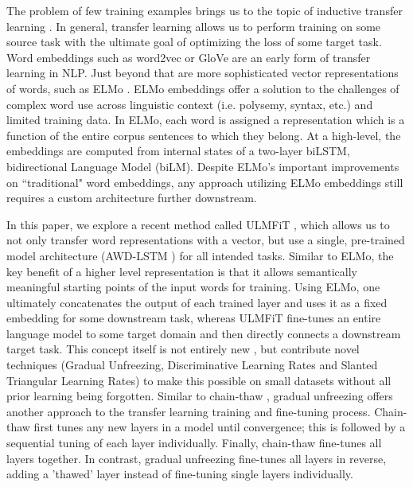 \documentclass[11pt,a4paper]{article}
\begin{document}
The problem of few training examples brings us to the topic of inductive transfer learning \cite{pan2010survey}. In general, transfer learning allows us to perform training on some source task with the ultimate goal of optimizing the loss of some target task. Word embeddings such as word2vec \cite{mikolov2013distributed} or GloVe \cite{pennington2014glove} are an early form of transfer learning in NLP. Just beyond that are more sophisticated vector representations of words, such as ELMo \cite{peters2018deep}. ELMo embeddings offer a solution to the challenges of complex word use across linguistic context (i.e. polysemy, syntax, etc.) and limited training data. In ELMo, each word is assigned a representation which is a function of the entire corpus sentences to which they belong. At a high-level, the embeddings are computed from internal states of a two-layer biLSTM, bidirectional Language Model (biLM). Despite ELMo's important improvements on ``traditional" word embeddings, any approach utilizing ELMo embeddings still requires a custom architecture further downstream. 

In this paper, we explore a recent method called ULMFiT \cite{howard2018universal}, which allows us to not only transfer word representations with a vector, but use a single, pre-trained model architecture (AWD-LSTM \citealp{DBLP:journals/corr/abs-1708-02182}) for all intended tasks. Similar to ELMo, the key benefit of a higher level representation is that it allows semantically meaningful starting points of the input words for training. Using ELMo, one ultimately concatenates the output of each trained layer and uses it as a fixed embedding for some downstream task, whereas ULMFiT fine-tunes an entire language model to some target domain and then directly connects a downstream target task. This concept itself is not entirely new \cite{DBLP:journals/corr/DaiL15a}, but  contribute novel techniques (Gradual Unfreezing, Discriminative Learning Rates and Slanted Triangular Learning Rates) to make this possible on small datasets without all prior learning being forgotten. Similar to chain-thaw \cite{felbo2017using}, gradual unfreezing offers another approach to the transfer learning training and fine-tuning process. Chain-thaw  first tunes any new layers in a model until convergence; this is followed by a sequential tuning of each layer individually. Finally, chain-thaw fine-tunes all layers together. In contrast, gradual unfreezing fine-tunes all layers in reverse, adding a 'thawed' layer instead of fine-tuning single layers individually.
\end{document}
